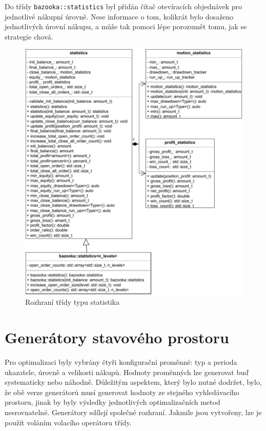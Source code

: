 Do třídy \texttt{bazooka::statistics} byl přidán čítač otevíracích objednávek pro jednotlivé nákupní úrovně.
Nese informace o tom, kolikrát bylo dosaženo jednotlivých úrovní nákupu, a může tak pomoci lépe porozumět tomu, jak se strategie chová.

\begin{figure}[htbp]
\centerline{\includegraphics[scale=0.85]{img/statistics-uml.pdf}}
\caption{Rozhraní třídy typu statistika}
\label{fig:statistics:uml}
\end{figure}

\chapter{Generátory stavového prostoru}
Pro optimalizaci byly vybrány čtyři konfigurační proměnné: typ a perioda ukazatele, úrovně a velikosti nákupů.
Hodnoty proměnných lze generovat buď systematicky nebo náhodně.
Důležitým aspektem, který bylo nutné dodržet, bylo, že obě verze generátorů musí generovat hodnoty ze stejného vyhledávacího prostoru, jinak by byly výsledky jednotlivých optimalizačních metod nesrovnatelné.
Generátory sdílejí společné rozhraní.
Jakmile jsou vytvořeny, lze je použít voláním volacího operátoru třídy.

